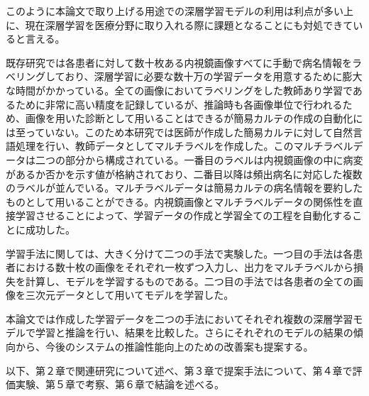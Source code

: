 このように本論文で取り上げる用途での深層学習モデルの利用は利点が多い上に、現在深層学習を医療分野に取り入れる際に課題となることにも対処できていると言える。

既存研究では各患者に対して数十枚ある内視鏡画像すべてに手動で病名情報をラベリングしており、深層学習に必要な数十万の学習データを用意するために膨大な時間がかかっている。全ての画像においてラベリングをした教師あり学習であるために非常に高い精度を記録しているが、推論時も各画像単位で行われるため、画像を用いた診断として用いることはできるが簡易カルテの作成の自動化には至っていない。このため本研究では医師が作成した簡易カルテに対して自然言語処理を行い、教師データとしてマルチラベルを作成した。このマルチラベルデータは二つの部分から構成されている。一番目のラベルは内視鏡画像の中に病変があるか否かを示す値が格納されており、二番目以降は頻出病名に対応した複数のラベルが並んでいる。マルチラベルデータは簡易カルテの病名情報を要約したものとして用いることができる。内視鏡画像とマルチラベルデータの関係性を直接学習させることによって、学習データの作成と学習全ての工程を自動化することに成功した。

学習手法に関しては、大きく分けて二つの手法で実験した。一つ目の手法は各患者における数十枚の画像をそれぞれ一枚ずつ入力し、出力をマルチラベルから損失を計算し、モデルを学習するものである。二つ目の手法では各患者の全ての画像を三次元データとして用いてモデルを学習した。

本論文では作成した学習データを二つの手法においてそれぞれ複数の深層学習モデルで学習と推論を行い、結果を比較した。さらにそれぞれのモデルの結果の傾向から、今後のシステムの推論性能向上のための改善案も提案する。

以下、第２章で関連研究について述べ、第３章で提案手法について、第４章で評価実験、第５章で考察、第６章で結論を述べる。
